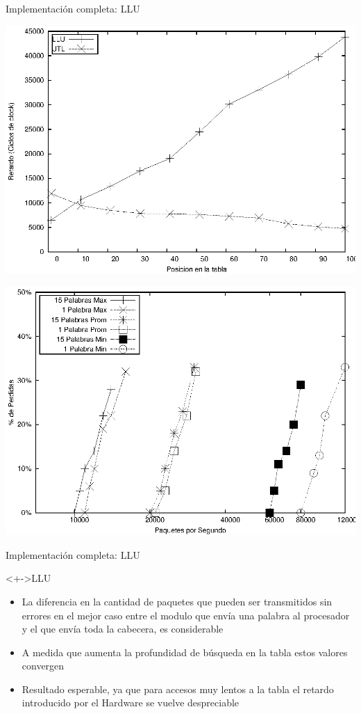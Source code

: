 \documentclass[xcolor=dvipsnames]{beamer}
\begin{document}
\begin{frame}{Implementación completa: LLU} 
\begin{flushleft}
\includegraphics[scale=0.20]{figures/llu-utlsof.eps} 
\end{flushleft}
\begin{center}
\includegraphics[scale=0.70]{figures/llupres.eps} 
\end{center}
\end{frame}


\begin{frame}{Implementación completa: LLU} 
 \begin{block}<+->{LLU}   
    \begin{itemize}
      \scriptsize
     	\item La diferencia en la cantidad de paquetes que pueden ser transmitidos sin errores en el mejor caso entre el modulo que envía una palabra al procesador y el que envía toda la cabecera, es considerable
     	\item A medida que aumenta la profundidad de búsqueda en la tabla estos valores convergen
	\item Resultado esperable, ya que para accesos muy lentos a la tabla el retardo introducido por el Hardware se vuelve despreciable
    \end{itemize}
  \end{block}
\end{frame}
\end{document}

